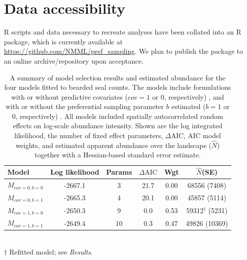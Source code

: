 \documentclass[times,mee,doublespace,]{besauth2}
\begin{document}


\vspace{.3in}
\section{Data accessibility}
R scripts and data necessary to recreate analyses have been collated into an R package, which is currently available at \url{https://github.com/NMML/pref_sampling}.  We plan to publish the package to an online archive/repository upon acceptance. \\






\pagebreak
\begin{table}[ht]
\caption{A summary of model selection results and estimated abundance for the four models fitted to bearded seal counts.  The models include formulations with or without predictive covariates ($cov=1$ or 0, respectively) , and with or without the preferential sampling parameter $b$ estimated ($b=1$ or 0, respectively) .  All models included spatially autocorrelated random effects on log-scale abundance intensity.  Shown are the log integrated likelihood, the number of fixed effect parameters, $\Delta \textrm{AIC}$, AIC model weights, and estimated apparent abundance over the landscape ($\hat{N}$) together with a Hessian-based standard error estimate.
}
\label{tab:aic}
\raggedright
\begin{tabular}{lccccc}
  \hline
  Model & Log likelihood & Params & $\Delta \textrm{AIC}$ & Wgt & $\hat{N}$(SE) \\
  \hline
  $M_{cov=0,b=0}$ & -2667.1 & 3 & 21.7 & 0.00 & 68556 (7408)\\
  $M_{cov=0,b=1}$ & -2665.3 & 4 & 20.1 & 0.00 & 45857 (5114) \\
  $M_{cov=1,b=0}$ & -2650.3 & 9 &  0.0 & 0.53 & 59312$^\dag$ (5231)  \\
  $M_{cov=1,b=1}$ & -2649.4 & 10 & 0.3 & 0.47 & 49826 (10369) \\
\hline
\end{tabular}
\\
$\dag$ Refitted model; see \textit{Results}.
\end{table}
\end{document}
